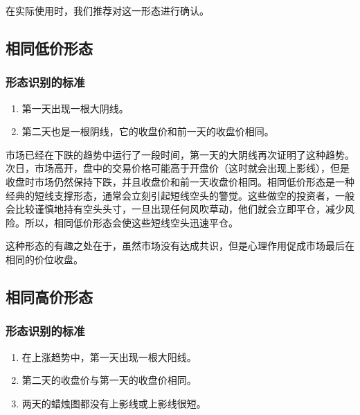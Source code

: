 在实际使用时，我们推荐对这一形态进行确认。
\subsection{相同低价形态}
\subsubsection*{形态识别的标准}
\begin{enumerate}
    \item 第一天出现一根大阴线。
    \item 第二天也是一根阴线，它的收盘价和前一天的收盘价相同。
\end{enumerate}

市场已经在下跌的趋势中运行了一段时间，第一天的大阴线再次证明了这种趋势。次日，市场高开，盘中的交易价格可能高于开盘价（这时就会出现上影线），但是收盘时市场仍然保持下跌，并且收盘价和前一天收盘价相同。相同低价形态是一种经典的短线支撑形态，通常会立刻引起短线空头的警觉。这些做空的投资者，一般会比较谨慎地持有空头头寸，一旦出现任何风吹草动，他们就会立即平仓，减少风险。所以，相同低价形态会使这些短线空头迅速平仓。

这种形态的有趣之处在于，虽然市场没有达成共识，但是心理作用促成市场最后在相同的价位收盘。
\subsection{相同高价形态}
\subsubsection*{形态识别的标准}
\begin{enumerate}
    \item 在上涨趋势中，第一天出现一根大阳线。
    \item 第二天的收盘价与第一天的收盘价相同。
    \item 两天的蜡烛图都没有上影线或上影线很短。
\end{enumerate}

